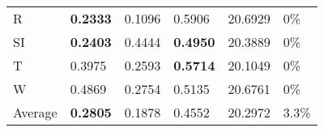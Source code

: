 \documentclass[11pt, a4paper]{article}
\begin{document}
\begin{table}[H]
\begin{tabular}{llllll}
R                                & \textbf{0.2333}                   & 0.1096                            & 0.5906                               & 20.6929                                     & 0\%                               \\
SI                        & \textbf{0.2403}                   & 0.4444                            & \textbf{0.4950}                      & 20.3889                                     & 0\%                               \\
T                              & 0.3975                            & 0.2593                            & \textbf{0.5714}                      & 20.1049                                     & 0\%                               \\
W                             & 0.4869                            & 0.2754                            & 0.5135                               & 20.6761                                     & 0\%                               \\ \hline
Average                               & \textbf{0.2805}                   & 0.1878                            & 0.4552                               & 20.2972                                     & 3.3\%
\end{tabular}
\end{table}
\end{document}
